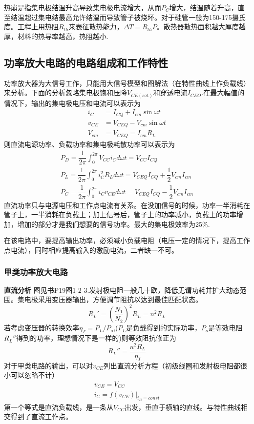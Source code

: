 \documentclass{ctexart}
\newcommand*{\noindbfquad}[1]{{\noindent \bf{#1} \qquad}}
\begin{document}
热崩是指集电极结温升高导致集电极电流增大，从而$P_{C}$增大，结温随着升高，直至结温超过集电结最高允许结温而导致管子被烧坏。对于硅管一般为150-175摄氏度。工程上用热阻$R_{th}$来表征散热能力，$\Delta T = R_{th}P$。散热器散热面积越大厚度越厚，材料的热导率越高，热阻越小.
\subsection{功率放大电路的电路组成和工作特性}
功率放大器为大信号工作，只能用大信号模型和图解法（在特性曲线上作负载线）来分析。下面的分析忽略集电极饱和压降$V_{CE(sat)}$和穿透电流$I_{CEO}$.在最大幅值的情况下，输出的集电极电压和电流可以表示为
\begin{align}
    i_{C}&=I_{CQ}+I_{cm}\sin \omega t\\
    v_{CE}&=V_{CEQ}-V_{cm}\sin \omega t\\
    V_{cm}&=V_{CEQ}=I_{cm}R_L
\end{align}
则直流电源功率、负载功率和集电极耗散功率可以表示为
\begin{align}
    P_D=\dfrac{1}{2\pi}\int_0^{2\pi}V_{CC}i_C d\omega t =V_{CC} I_{CQ}\\
    P_L=\dfrac{1}{2\pi}\int_0^{2\pi}i_C^2 R_L d\omega t =V_{CEQ}I_{CQ}+\dfrac{1}{2}V_{cm}I_{cm}\\
    P_C=\dfrac{1}{2\pi}\int_0^{2\pi}i_C v_{CE}d\omega t =V_{CEQ}I_{CQ}-\dfrac{1}{2}V_{cm}I_{cm}
\end{align}
直流功率只与电源电压和工作点电流有关系。在没加信号的时候，功率一半消耗在管子上，一半消耗在负载上；加上信号后，管子上的功率减小，负载上的功率增加，增加的部分才是我们想要的信号功率。最大的集电极效率为25\%.

在该电路中，要提高输出功率，必须减小负载电阻（电压一定的情况下，提高工作点电流），同时相应提高输入的激励电流，二者缺一不可。
\subsubsection{甲类功率放大电路}
\noindbfquad{直流分析}
图见书P19图1-2-3.发射极电阻一般几十欧，降低无谓功耗并扩大动态范围。集电极采用变压器输出，方便调节阻抗以达到最佳匹配状态。
\begin{equation}
    R_L'=(\dfrac{N_1}{N_2})^2R_L=n^2 R_L
\end{equation}
若考虑变压器的转换效率$\eta_T=P_L/P_o$,($P_L$是负载得到的实际功率，$P_o$是等效电阻$R_L''$得到的功率，理想情况下是一样的)则等效阻抗修正为
\begin{equation}
    R_L''=\dfrac{n^2 R_L}{\eta_T}
\end{equation}
对于甲类电路的输出，可以对$v_{CE}$列出直流分析方程（初级线圈和发射极电阻都很小可以忽略不计）
\begin{align}
    v_{CE}=V_{CC}\\
    i_C=f(v_{CE})|_{i_B=const}
\end{align}
第一个等式是直流负载线，是一条从$V_{CC}$出发，垂直于横轴的直线。与特性曲线相交得到了直流工作点。
\end{document}
